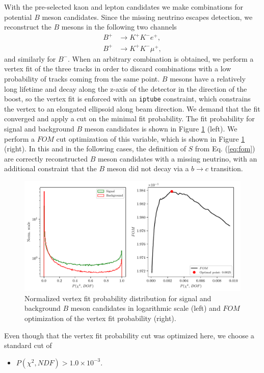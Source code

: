 \documentclass[headings=standardclasses,headings=big,oneside,a4paper,openany,12pt]{scrbook}
\newcommand {\E}[1]{\times 10^{#1}}
\begin{document}
With the pre-selected kaon and lepton candidates we make combinations for potential $B$ meson candidates. Since the missing neutrino escapes detection, we reconstruct the $B$ mesons in the following two channels
\begin{align*}
B^+ &\to K^+ K^- e^+, \\
B^+ &\to K^+ K^- \mu^+,
\end{align*}
and similarly for $B^-$. When an arbitrary combination is obtained, we perform a vertex fit of the three tracks in order to discard combinations with a low probability of tracks coming from the same point. $B$ mesons have a relatively long lifetime and decay along the z-axis of the detector in the direction of the boost, so the vertex fit is enforced with an \texttt{iptube} constraint, which constrains the vertex to an elongated ellipsoid along beam direction. We demand that the fit converged and apply a cut on the minimal fit probability. The fit probability for signal and background $B$ meson candidates is shown in Figure \ref{fig:vtx} (left). We perform a $FOM$ cut optimization of this variable, which is shown in Figure \ref{fig:vtx} (right). In this and in the following cases, the definition of $S$ from Eq. (\ref{eq:fom}) are correctly reconstructed $B$ meson candidates with a missing neutrino, with an additional constraint that the $B$ meson did not decay via a $b \to c$ transition.

\begin{figure}[H]
\centering
\captionsetup{width=0.8\linewidth}
\includegraphics[width=\linewidth]{fig/VTX}
\caption{Normalized vertex fit probability distribution for signal and background $B$ meson candidates in logarithmic scale (left) and $FOM$ optimization of the vertex fit probability (right).}
\label{fig:vtx}
\end{figure}

Even though that the vertex fit probability cut was optimized here, we choose a standard cut of
\begin{itemize}
\item $P(\chi^2,NDF) > 1.0\E{-3}$.
\end{itemize}
\end{document}
